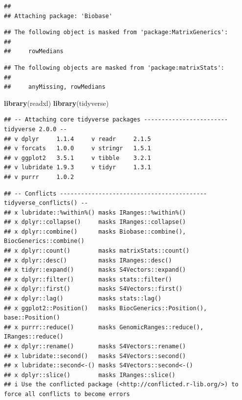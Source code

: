 \documentclass[
]{article}
\newenvironment{Shaded}{\begin{snugshade}}{\end{snugshade}}
\newcommand{\FunctionTok}[1]{\textcolor[rgb]{0.13,0.29,0.53}{\textbf{#1}}}
\newcommand{\NormalTok}[1]{#1}
\begin{document}
\begin{verbatim}
## 
## Attaching package: 'Biobase'
\end{verbatim}

\begin{verbatim}
## The following object is masked from 'package:MatrixGenerics':
## 
##     rowMedians
\end{verbatim}

\begin{verbatim}
## The following objects are masked from 'package:matrixStats':
## 
##     anyMissing, rowMedians
\end{verbatim}

\begin{Shaded}
\begin{Highlighting}[]
\FunctionTok{library}\NormalTok{(readxl)}
\FunctionTok{library}\NormalTok{(tidyverse)}
\end{Highlighting}
\end{Shaded}

\begin{verbatim}
## -- Attaching core tidyverse packages ------------------------ tidyverse 2.0.0 --
## v dplyr     1.1.4     v readr     2.1.5
## v forcats   1.0.0     v stringr   1.5.1
## v ggplot2   3.5.1     v tibble    3.2.1
## v lubridate 1.9.3     v tidyr     1.3.1
## v purrr     1.0.2
\end{verbatim}

\begin{verbatim}
## -- Conflicts ------------------------------------------ tidyverse_conflicts() --
## x lubridate::%within%() masks IRanges::%within%()
## x dplyr::collapse()     masks IRanges::collapse()
## x dplyr::combine()      masks Biobase::combine(), BiocGenerics::combine()
## x dplyr::count()        masks matrixStats::count()
## x dplyr::desc()         masks IRanges::desc()
## x tidyr::expand()       masks S4Vectors::expand()
## x dplyr::filter()       masks stats::filter()
## x dplyr::first()        masks S4Vectors::first()
## x dplyr::lag()          masks stats::lag()
## x ggplot2::Position()   masks BiocGenerics::Position(), base::Position()
## x purrr::reduce()       masks GenomicRanges::reduce(), IRanges::reduce()
## x dplyr::rename()       masks S4Vectors::rename()
## x lubridate::second()   masks S4Vectors::second()
## x lubridate::second<-() masks S4Vectors::second<-()
## x dplyr::slice()        masks IRanges::slice()
## i Use the conflicted package (<http://conflicted.r-lib.org/>) to force all conflicts to become errors
\end{verbatim}
\end{document}
